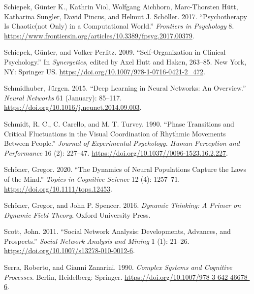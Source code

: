 \documentclass[
  letterpaper,
]{scrbook}
\newlength{\cslhangindent}
\newlength{\cslentryspacingunit} %
\newenvironment{CSLReferences}[2] %
 {%
  \setlength{\parindent}{0pt}
  \ifodd #1
  \let\oldpar\par
  \def\par{\hangindent=\cslhangindent\oldpar}
  \fi
  \setlength{\parskip}{#2\cslentryspacingunit}
 }%
 {}
\begin{document}
\begin{CSLReferences}{1}{0}
\leavevmode{}%
Schiepek, Günter K., Kathrin Viol, Wolfgang Aichhorn, Marc-Thorsten
Hütt, Katharina Sungler, David Pincus, and Helmut J. Schöller. 2017.
{``Psychotherapy Is Chaotic{\textemdash}(not Only) in a Computational
World.''} \emph{Frontiers in Psychology} 8.
\url{https://www.frontiersin.org/articles/10.3389/fpsyg.2017.00379}.

\leavevmode{}%
Schiepek, Günter, and Volker Perlitz. 2009. {``Self-{Organization} in
{Clinical Psychology}.''} In \emph{Synergetics}, edited by Axel Hutt and
Haken, 263--85. {New York, NY}: {Springer US}.
\url{https://doi.org/10.1007/978-1-0716-0421-2_472}.

\leavevmode{}%
Schmidhuber, Jürgen. 2015. {``Deep Learning in Neural Networks: {An}
Overview.''} \emph{Neural Networks} 61 (January): 85--117.
\url{https://doi.org/10.1016/j.neunet.2014.09.003}.

\leavevmode{}%
Schmidt, R. C., C. Carello, and M. T. Turvey. 1990. {``Phase Transitions
and Critical Fluctuations in the Visual Coordination of Rhythmic
Movements Between People.''} \emph{Journal of Experimental Psychology.
Human Perception and Performance} 16 (2): 227--47.
\url{https://doi.org/10.1037//0096-1523.16.2.227}.

\leavevmode{}%
Schöner, Gregor. 2020. {``The {Dynamics} of {Neural Populations Capture}
the {Laws} of the {Mind}.''} \emph{Topics in Cognitive Science} 12 (4):
1257--71. \url{https://doi.org/10.1111/tops.12453}.

\leavevmode{}%
Schöner, Gregor, and John P. Spencer. 2016. \emph{Dynamic Thinking: {A}
Primer on Dynamic Field Theory}. {Oxford University Press}.

\leavevmode{}%
Scott, John. 2011. {``Social Network Analysis: Developments, Advances,
and Prospects.''} \emph{Social Network Analysis and Mining} 1 (1):
21--26. \url{https://doi.org/10.1007/s13278-010-0012-6}.

\leavevmode{}%
Serra, Roberto, and Gianni Zanarini. 1990. \emph{Complex {Systems} and
{Cognitive Processes}}. {Berlin, Heidelberg}: {Springer}.
\url{https://doi.org/10.1007/978-3-642-46678-6}.


\end{CSLReferences}
\end{document}
